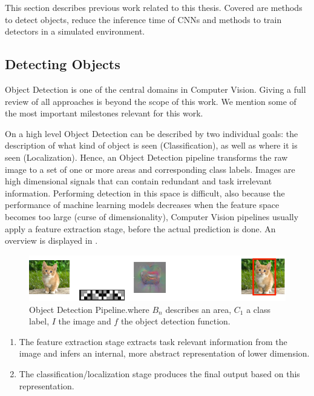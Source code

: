This section describes previous work related to this thesis. Covered are methods to detect objects, reduce the inference time of \acp{CNN} and methods to train detectors in a simulated environment.

\subsection{Detecting Objects}
\label{sec:object_detection:related}
Object Detection is one of the central domains in Computer Vision. Giving a full review of all approaches is beyond the scope of this work. We mention some of the most important milestones relevant for this work.

On a high level Object Detection can be described by two individual goals: the description of what kind of object is seen (Classification), as well as where it is seen (Localization). Hence, an Object Detection pipeline transforms the raw image to a set of one or more areas and corresponding class labels. Images are high dimensional signals that can contain redundant and task irrelevant information. Performing detection in this space is difficult, also because the performance of machine learning models decreases when the feature space becomes too large (curse of dimensionality), Computer Vision pipelines usually apply a feature extraction stage, before the actual prediction is done. An overview is displayed in .

\begin{figure}[hbtp]
	
	\centering
	\includegraphics[width=\linewidth]{fig/ObjectDetection}
	\caption{Object Detection Pipeline.where $B_n$ describes an area, $C_1$ a class label, $I$ the image and $f$ the object detection function.}
	\label{fig:obj_pipeline}
\end{figure}
\begin{enumerate}
	\item The feature extraction stage extracts task relevant information from the image and infers an internal, more abstract representation of lower dimension.
	
	\item The classification/localization stage produces the final output based on this representation. 
	
\end{enumerate}

